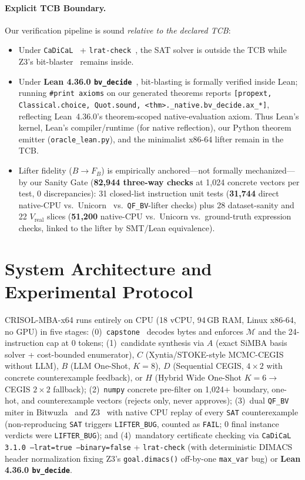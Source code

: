 \documentclass[11pt,a4paper]{article}
\begin{document}
\paragraph{Explicit TCB Boundary.}
Our verification pipeline is sound \emph{relative to the declared TCB}:
\begin{itemize}[leftmargin=1.5em]
  \item Under \texttt{CaDiCaL}~\cite{cadical2024} + \texttt{lrat-check}~\cite{lrat2017}, the SAT solver is outside the TCB while Z3's bit-blaster~\cite{z3_2008} remains inside.
  \item Under \textbf{Lean 4.36.0 \texttt{bv\_decide}}~\cite{lean4_2021}, bit-blasting is formally verified inside Lean; running \texttt{\#print axioms} on our generated theorems reports \texttt{[propext, Classical.choice, Quot.sound, <thm>.\_native.bv\_decide.ax\_*]}, reflecting Lean~4.36.0's theorem-scoped native-evaluation axiom. Thus Lean's kernel, Lean's compiler/runtime (for native reflection), our Python theorem emitter (\texttt{oracle\_lean.py}), and the minimalist x86-64 lifter remain in the TCB.
  \item Lifter fidelity ($B \to F_B$) is empirically anchored—not formally mechanized—by our Sanity Gate (\textbf{82,944 three-way checks} at 1,024 concrete vectors per test, 0 discrepancies): 31 closed-list instruction unit tests (\textbf{31,744} direct native-CPU vs.\ Unicorn~\cite{unicorn2015} vs.\ \texttt{QF\_BV}-lifter checks) plus 28 dataset-sanity and 22 $V_{\mathrm{real}}$ slices (\textbf{51,200} native-CPU vs.\ Unicorn vs.\ ground-truth expression checks, linked to the lifter by SMT/Lean equivalence).
\end{itemize}

\section{System Architecture and Experimental Protocol}

CRISOL-MBA-x64 runs entirely on CPU (18 vCPU, 94\,GB RAM, Linux x86-64, no GPU) in five stages:
(0)~\texttt{capstone}~\cite{capstone2014} decodes bytes and enforces $\mathcal{M}$ and the 24-instruction cap at 0 tokens;
(1)~candidate synthesis via $A$ (exact SiMBA basis solver + cost-bounded enumerator), $C$ (Xyntia/STOKE-style MCMC-CEGIS without LLM), $B$ (LLM One-Shot, $K=8$), $D$ (Sequential CEGIS, $4\times 2$ with concrete counterexample feedback), or $H$ (Hybrid Wide One-Shot $K=6 \to$ CEGIS $2\times 2$ fallback);
(2)~\texttt{numpy} concrete pre-filter on 1,024+ boundary, one-hot, and counterexample vectors (rejects only, never approves);
(3)~dual \texttt{QF\_BV} miter in Bitwuzla~\cite{bitwuzla2023} and Z3~\cite{z3_2008} with native CPU replay of every \texttt{SAT} counterexample (non-reproducing \texttt{SAT} triggers \texttt{LIFTER\_BUG}, counted as \texttt{FAIL}; 0 final instance verdicts were \texttt{LIFTER\_BUG}); and
(4)~mandatory certificate checking via \texttt{CaDiCaL 3.1.0 --lrat=true --binary=false} + \texttt{lrat-check} (with deterministic DIMACS header normalization fixing Z3's \texttt{goal.dimacs()} off-by-one \texttt{max\_var} bug) or \textbf{Lean 4.36.0 \texttt{bv\_decide}}.
\end{document}
